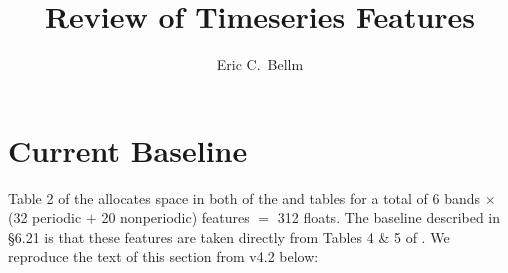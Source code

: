 \documentclass[DM,authoryear,toc]{lsstdoc}
\title{Review of Timeseries Features}
\author{%
Eric C.\ Bellm
}
\date{\vcsDate}
\begin{document}
\maketitle


\section{Current Baseline}

Table 2 of the \DPDD{} allocates space in both of the \DIAObject and \Object tables for a total of 6 bands $\times$ (32 periodic $+$ 20 nonperiodic) features $=$ 312 floats.
The baseline described in  \S 6.21 is that these features are taken directly from Tables 4 \& 5 of \citet{2011ApJ...733...10R}.
We reproduce the text of this section from \DPDD v4.2 below:
\end{document}

